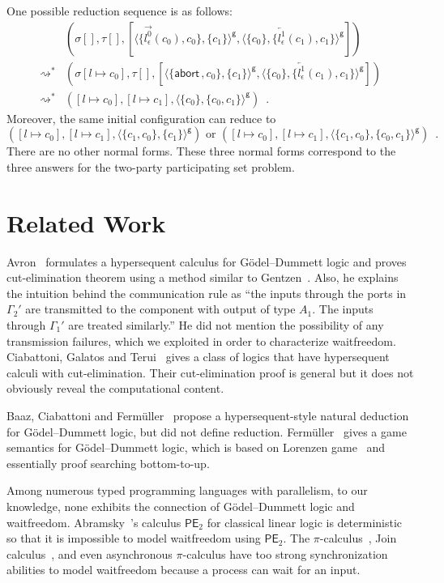 \documentclass[doctor]{iscs-thesis}
\newcommand{\reduce}{\rightsquigarrow}
\newcommand{\reduction}{\reduce^\ast}
\newcommand{\g} [0]{\mathsf{g}}
\newcommand{\gpair} [1]{\langle{#1}\rangle^{\g}}
\newcommand{\cotuple}[1]{[{#1}]}
\newcommand{\ltor}[4]{\overrightarrow{{#2}^{#1}_{#3}} \left({#4}\right)}
\newcommand{\rtol}[4]{\overleftarrow{{#2}^{#1}_{#3}} \left({#4}\right)}
\newcommand{\abort}{\mathsf{abort\,}}
\newcommand{\lstore}{{\sigma}}
\newcommand{\rstore}{{\tau}}
\newcommand{\conf}[3]{(\lstore{#1},\rstore{#2},{#3})}
\newcommand{\concreteconf}[3]{({#1},{#2},{#3})}
\begin{document}
One possible reduction sequence is as follows:
\begin{align*}
 & \conf{[]}{[]}
 {\cotuple{\gpair{\{\ltor 0 l \epsilon {c_0}, {c_0}\}, \{{c_1}\}},
 \gpair {\{{c_0}\}, \{\rtol 1 l\epsilon {c_1}, {c_1}\}}}} \\
 \reduction &
 \conf{[l\mapsto {c_0}]}{[]}
 {
 \cotuple{
 \gpair{\{\abort, {c_0}\}, \{{c_1}\}},
 \gpair{\{{c_0}\}, \{\rtol 1 l\epsilon {c_1}, {c_1}\}}
 }
 }
 \\
 \reduction &
 \concreteconf{[l\mapsto {c_0}]}{[l\mapsto {c_1}]}{\gpair{\{{c_0}\}, \{c_0, c_1\}}}\enspace.
\end{align*}
Moreover, the same initial configuration can reduce to
\begin{equation*}
 \concreteconf{[l\mapsto c_0]}{[l\mapsto c_1]}{\gpair{\{c_1,c_0\},
 \{c_1\}}}\text{ or }
 \concreteconf{[l\mapsto c_0]}{[l\mapsto c_1]}{\gpair{\{c_1,c_0\},
 \{c_0, c_1\}}}\enspace. 
\end{equation*}
There are no other normal forms.
These three normal forms correspond to the three answers for the
two-party participating set problem.

\section{Related Work}
\label{related}
Avron~\cite{avron91} formulates a
hypersequent calculus for G\"odel--Dummett logic and proves
cut-elimination theorem using a method
similar to Gentzen~\cite{gentzen}.
Also, he explains the intuition behind the communication rule as
``the inputs through the ports in $\Gamma_2'$ are transmitted to the
component with output of type $A_1.$  The inputs through $\Gamma_1'$ are
treated similarly.''  He did not mention the possibility of
any transmission failures, which we exploited
in order to characterize waitfreedom.
Ciabattoni, Galatos and Terui~\cite{alg} gives a class of logics
that have
hypersequent calculi with
cut-elimination.
Their cut-elimination proof is general but it does not
obviously reveal the computational content.

Baaz, Ciabattoni and Ferm\"uller~\cite{natural} propose a 
hypersequent-style natural deduction for G\"odel--Dummett logic, but
did not define reduction.
Ferm\"uller~\cite{parallel} gives a game semantics for G\"odel--Dummett
logic, which is based on Lorenzen game~\cite{curryhoward} and essentially
proof searching bottom-to-up.

Among numerous typed programming languages with parallelism,
to our knowledge, none exhibits
the connection of G\"odel--Dummett logic and waitfreedom.
Abramsky~\cite{abramsky1993computational}'s calculus $\mathsf{PE}_2$
for classical linear logic is
deterministic
\cite[Theorem~7.9]{abramsky1993computational} so that it is
impossible to model
waitfreedom using $\mathsf{PE}_2$.
The $\pi$-calculus~\cite{milner1999communicating}, 
Join calculus~\cite{join},
and even asynchronous
$\pi$-calculus \cite{hondatokoro}
have too strong synchronization abilities to model waitfreedom because
a process can wait for an input.
\end{document}

